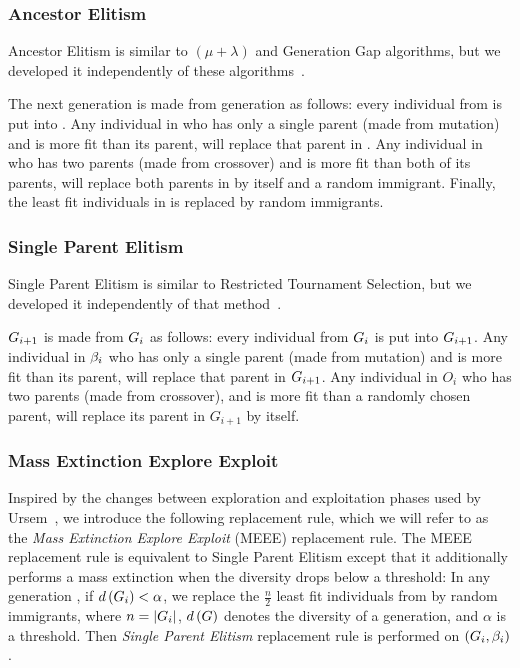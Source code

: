\subsubsection{Ancestor Elitism}
Ancestor Elitism is similar to $(\mu + \lambda)$ and Generation Gap algorithms, but we developed it independently of these algorithms~\cite[p. 34, p. 50]{Luke2013Metaheuristics}.

The next generation  is made from generation  as follows: every individual from  is put into . Any individual in  who has only a single parent (made from mutation) and is more fit than its parent, will replace that parent in . Any individual in  who has two parents (made from crossover) and is more fit than both of its parents, will replace both parents in  by itself and a random immigrant. Finally, the  least fit individuals in  is replaced by random immigrants.

\subsubsection{Single Parent Elitism}
Single Parent Elitism is similar to Restricted Tournament Selection, but we developed it independently of that method~\cite[p.\ 132]{Luke2013Metaheuristics}.

$G_{i+1}$ is made from $G_{i}$ as follows: every individual from $G_{i}$ is put into $G_{i+1}$. Any individual in $\beta_{i}$ who has only a single parent (made from mutation) and is more fit than its parent, will replace that parent in $G_{i+1}$.
Any individual in $O_i$ who has two parents (made from crossover), and is more fit than a randomly chosen parent, will replace its parent in $G_{i+1}$ by itself.

\subsubsection{Mass Extinction Explore Exploit}
Inspired by the changes between exploration and exploitation phases used by Ursem~\cite{ursem2002diversity}, we introduce the following replacement rule, which we will refer to as the \emph{Mass Extinction Explore Exploit} (MEEE) replacement rule. The MEEE replacement rule is equivalent to Single Parent Elitism except that it additionally performs a mass extinction when the diversity drops below a threshold: In any generation , if $d\left(G_{i}\right) < \alpha$, we replace the $\tfrac{n}{2}$ least fit individuals from  by random immigrants, where $n = \lvert G_{i}\rvert$, $d\left(G\right)$ denotes the diversity of a generation, and $\alpha$ is a threshold. Then \emph{Single Parent Elitism} replacement rule is performed on $\left(G_{i}, \beta_{i}\right)$.

